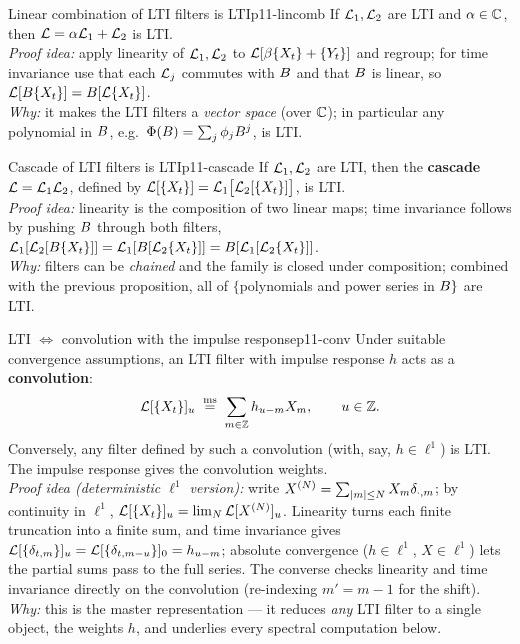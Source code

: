 \begin{proposition}{Linear combination of LTI filters is LTI}{p11-lincomb}
If $\mathcal{L}_1,\mathcal{L}_2$ are LTI and $\alpha\in\mathbb{C}$, then
$\mathcal{L}=\alpha\mathcal{L}_1+\mathcal{L}_2$ is LTI.\\[2pt]
\textit{Proof idea:} apply linearity of $\mathcal{L}_1,\mathcal{L}_2$ to
$\mathcal{L}[\beta\{X_t\}+\{Y_t\}]$ and regroup; for time invariance use that each
$\mathcal{L}_j$ commutes with $B$ and that $B$ is linear, so
$\mathcal{L}[B\{X_t\}]=B[\mathcal{L}\{X_t\}]$.\\
\textit{Why:} it makes the LTI filters a \emph{vector space} (over $\mathbb{C}$); in
particular any polynomial in $B$, e.g.\ $\Phi(B)=\sum_j\phi_jB^j$, is
LTI.
\end{proposition}

\begin{proposition}{Cascade of LTI filters is LTI}{p11-cascade}
If $\mathcal{L}_1,\mathcal{L}_2$ are LTI, then the \textbf{cascade}
$\mathcal{L}=\mathcal{L}_1\mathcal{L}_2$, defined by
$\mathcal{L}[\{X_t\}]=\mathcal{L}_1\big[\mathcal{L}_2[\{X_t\}]\big]$, is LTI.\\[2pt]
\textit{Proof idea:} linearity is the composition of two linear maps; time
invariance follows by pushing $B$ through both filters,
$\mathcal{L}_1[\mathcal{L}_2[B\{X_t\}]]=\mathcal{L}_1[B[\mathcal{L}_2\{X_t\}]]
=B[\mathcal{L}_1[\mathcal{L}_2\{X_t\}]]$.\\
\textit{Why:} filters can be \emph{chained} and the family is closed under
composition; combined with the previous proposition, all of $\{$polynomials and
power series in $B\}$ are LTI.
\end{proposition}

\begin{theorem}{LTI $\Leftrightarrow$ convolution with the impulse response}{p11-conv}
Under suitable convergence assumptions, an LTI filter with impulse response $h$
acts as a \textbf{convolution}:
\[
\mathcal{L}[\{X_t\}]_u\;\overset{\mathrm{ms}}{=}\;\sum_{m\in\mathbb{Z}}h_{u-m}X_m,\qquad u\in\mathbb{Z} .
\]
Conversely, any filter defined by such a convolution (with, say, $h\in\ell^1$)
is LTI. The impulse response gives the convolution weights.\\[2pt]
\textit{Proof idea (deterministic $\ell^1$ version):}
write $X^{(N)}=\sum_{\left\lvert m \right\rvert\le N}X_m\delta_{\cdot,m}$; by continuity in
$\ell^1$, $\mathcal{L}[\{X_t\}]_u=\lim_N\mathcal{L}[X^{(N)}]_u$. Linearity turns each finite
truncation into a finite sum, and time invariance gives
$\mathcal{L}[\{\delta_{t,m}\}]_u=\mathcal{L}[\{\delta_{t,m-u}\}]_0=h_{u-m}$; absolute
convergence ($h\in\ell^1$, $X\in\ell^1$) lets the partial sums pass to the full
series. The converse checks linearity and time invariance directly on the
convolution (re-indexing $m'=m-1$ for the shift).\\
\textit{Why:} this is the master representation --- it reduces \emph{any} LTI
filter to a single object, the weights $h$, and underlies every spectral
computation below.
\end{theorem}

